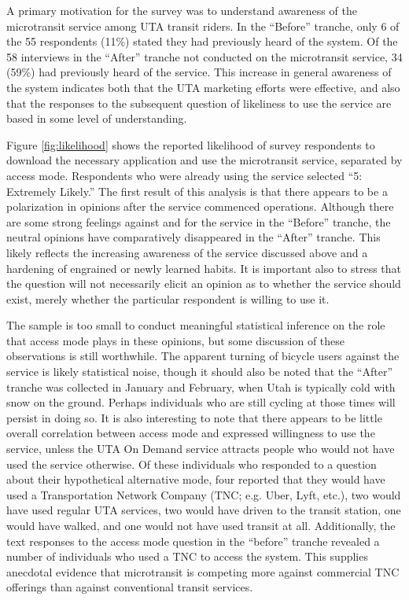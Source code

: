 \documentclass[smartcities,article,submit,moreauthors,pdftex]{Definitions/mdpi}
\begin{document}
A primary motivation for the survey was to understand awareness of the microtransit service among UTA transit riders. In the “Before” tranche, only 6 of the 55 respondents (11\%) stated they had previously heard of the system. Of the 58 interviews in the “After” tranche not conducted on the microtransit service, 34 (59\%) had previously heard of the service. This increase in general awareness of the system indicates both that the UTA marketing efforts were effective, and also that the responses to the subsequent question of likeliness to use the service are based in some level of understanding.

Figure \ref{fig:likelihood} shows the reported likelihood of survey respondents to download the necessary application and use the microtransit service, separated by access mode. Respondents who were already using the service selected “5: Extremely Likely.” The first result of this analysis is that there appears to be a polarization in opinions after the service commenced operations. Although there are some strong feelings against and for the service in the “Before” tranche, the neutral opinions have comparatively disappeared in the “After” tranche. This likely reflects the increasing awareness of the service discussed above and a hardening of engrained or newly learned habits. It is important also to stress that the question will not necessarily elicit an opinion as to whether the service should exist, merely whether the particular respondent is willing to use it. 

The sample is too small to conduct meaningful statistical inference on the role that access mode plays in these opinions, but some discussion of these observations is still worthwhile. The apparent turning of bicycle users against the service is likely statistical noise, though it should also be noted that the “After” tranche was collected in January and February, when Utah is typically cold with snow on the ground. Perhaps individuals who are still cycling at those times will persist in doing so. It is also interesting to note that there appears to be little overall correlation between access mode and expressed willingness to use the service, unless the UTA On Demand service attracts people who would not have used the service otherwise. Of these individuals who responded to a question about their hypothetical alternative mode, four reported that they would have used a Transportation Network Company (TNC; e.g. Uber, Lyft, etc.), two would have used regular UTA services, two would have driven to the transit station, one would have walked, and one would not have used transit at all. Additionally, the text responses to the access mode question in the “before” tranche revealed a number of individuals who used a TNC to access the system. This supplies anecdotal evidence that microtransit is competing more against commercial TNC offerings than against conventional transit services. 
\end{document}
